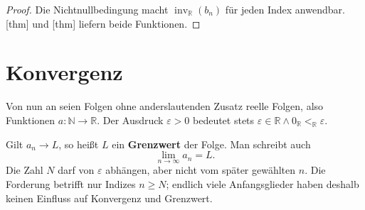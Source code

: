 \documentclass[main.tex]{subfiles}
\providecommand{\RealLt}{\mathrel{<_{\mathbb R}}}
\providecommand{\RealZero}{0_{\mathbb R}}
\providecommand{\RealInv}[1]{\operatorname{inv}_{\mathbb R}\!\left(#1\right)}
\begin{document}
\begin{proof}
Die Nichtnullbedingung macht \(\RealInv{b_n}\) für jeden Index anwendbar.
[thm] und
[thm] liefern beide
Funktionen.
\end{proof}

\section{Konvergenz}

Von nun an seien Folgen ohne anderslautenden Zusatz reelle Folgen, also
Funktionen \(a\colon\mathbb N\to\mathbb R\). Der Ausdruck
\(\varepsilon>0\) bedeutet stets
\(\varepsilon\in\mathbb R\land\RealZero\RealLt\varepsilon\).


Gilt \(a_n\to L\), so heißt \(L\) ein \textbf{Grenzwert} der Folge. Man
schreibt auch
\[
  \lim_{n\to\infty}a_n=L.
\]
Die Zahl \(N\) darf von \(\varepsilon\) abhängen, aber nicht vom später
gewählten \(n\). Die Forderung betrifft nur Indizes \(n\geq N\); endlich
viele Anfangsglieder haben deshalb keinen Einfluss auf Konvergenz und
Grenzwert.
\end{document}

